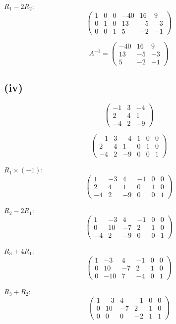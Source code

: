 \documentclass[12pt]{article}
\begin{document}
$R_1 - 2R_2$:
\[
	\begin{pmatrix}
		1 & 0 & 0 & -40 & 16 & 9  \\
		0 & 1 & 0 & 13  & -5 & -3 \\
		0 & 0 & 1 & 5   & -2 & -1
	\end{pmatrix}
\]

\[
	A^{-1} = \begin{pmatrix}
		-40 & 16 & 9  \\
		13  & -5 & -3 \\
		5   & -2 & -1
	\end{pmatrix}
\]

\subsection*{(iv)}
\[
	\begin{pmatrix}
		-1 & 3 & -4 \\
		2  & 4 & 1  \\
		-4 & 2 & -9
	\end{pmatrix}
\]

\[
	\begin{pmatrix}
		-1 & 3 & -4 & 1 & 0 & 0 \\
		2  & 4 & 1  & 0 & 1 & 0 \\
		-4 & 2 & -9 & 0 & 0 & 1
	\end{pmatrix}
\]

$R_1 \times (-1)$:
\[
	\begin{pmatrix}
		1 & -3 & 4  & -1 & 0 & 0 \\
		2 & 4  & 1  & 0  & 1 & 0 \\
		-4 & 2  & -9 & 0  & 0 & 1
	\end{pmatrix}
\]

$R_2 - 2R_1$:
\[
	\begin{pmatrix}
		1 & -3 & 4  & -1 & 0 & 0 \\
		0 & 10 & -7 & 2  & 1 & 0 \\
		-4 & 2  & -9 & 0  & 0 & 1
	\end{pmatrix}
\]

$R_3 + 4R_1$:
\[
	\begin{pmatrix}
		1 & -3  & 4   & -1 & 0 & 0 \\
		0 & 10  & -7  & 2  & 1 & 0 \\
		0 & -10 & 7   & -4 & 0 & 1
	\end{pmatrix}
\]

$R_3 + R_2$:
\[
	\begin{pmatrix}
		1 & -3 & 4  & -1 & 0 & 0 \\
		0 & 10 & -7 & 2  & 1 & 0 \\
		0 & 0  & 0  & -2 & 1 & 1
	\end{pmatrix}
\]
\end{document}
